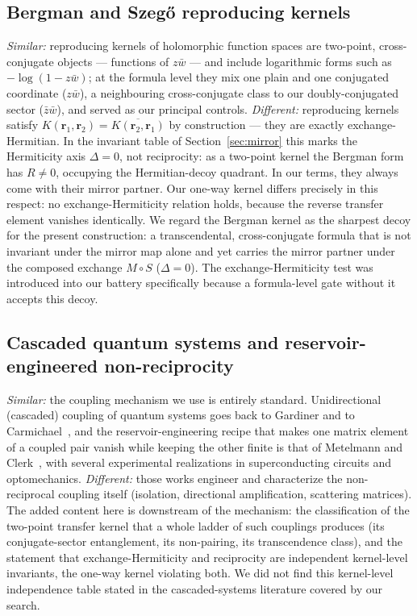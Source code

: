\documentclass[11pt,a4paper]{article}
\newcommand{\zb}{\bar{z}}
\newcommand{\wb}{\bar{w}}
\begin{document}
\subsection{Bergman and Szeg\H{o} reproducing kernels}

\emph{Similar:} reproducing kernels of holomorphic function spaces are two-point,
cross-conjugate objects --- functions of $z\wb$ --- and include logarithmic forms
such as $-\log(1 - z\wb)$; at the formula level they mix one plain and one
conjugated coordinate ($z\wb$), a neighbouring cross-conjugate class to our
doubly-conjugated sector ($\zb\wb$), and served as our principal controls.
\emph{Different:} reproducing kernels satisfy
$K(\mathbf{r}_1, \mathbf{r}_2) = \overline{K(\mathbf{r}_2, \mathbf{r}_1)}$ by
construction --- they are exactly exchange-Hermitian. In the invariant table
of Section~\ref{sec:mirror} this marks the Hermiticity axis $\Delta = 0$, not
reciprocity: as a two-point kernel the Bergman form has $R \neq 0$, occupying
the Hermitian-decoy quadrant. In our terms, they always come with their mirror
partner. Our
one-way kernel differs precisely in this respect: no exchange-Hermiticity
relation holds, because the reverse transfer element vanishes identically. We
regard the Bergman kernel as the sharpest decoy for the present construction: a
transcendental, cross-conjugate formula that is not invariant under the
mirror map alone and yet carries the mirror partner under the composed
exchange $M \circ S$ ($\Delta = 0$). The exchange-Hermiticity test
was introduced into our battery specifically because a formula-level gate
without it accepts this decoy.

\subsection{Cascaded quantum systems and reservoir-engineered non-reciprocity}

\emph{Similar:} the coupling mechanism we use is entirely standard.
Unidirectional (cascaded) coupling of quantum systems goes back to Gardiner and
to Carmichael~\cite{Gardiner1993,Carmichael1993}, and the reservoir-engineering
recipe that makes one matrix element of a coupled pair vanish while keeping the
other finite is that of Metelmann and Clerk~\cite{MetelmannClerk2015}, with
several experimental realizations in superconducting circuits and
optomechanics. \emph{Different:} those works engineer and characterize the
non-reciprocal coupling itself (isolation, directional amplification,
scattering matrices). The added content here is downstream of the mechanism:
the classification of the two-point transfer kernel that a whole ladder of such
couplings produces (its conjugate-sector entanglement, its non-pairing, its
transcendence class), and the statement that exchange-Hermiticity and
reciprocity are independent kernel-level invariants, the one-way kernel
violating both. We did not find this kernel-level independence table stated
in the cascaded-systems literature covered by our search.
\end{document}
